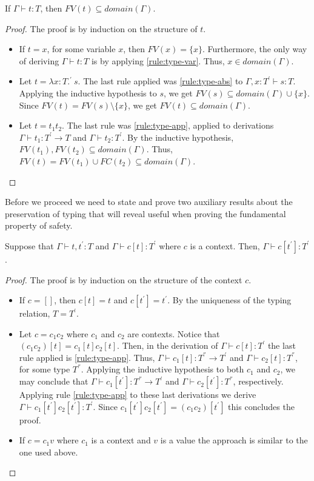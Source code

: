 \begin{lemma}\label{lemma3}
If $\Gamma \vdash t : T$, then $FV(t) \subseteq domain(\Gamma)$. 
\end{lemma} 
\begin{proof}
The proof is by induction on the structure of $t$. 
\begin{itemize}
\item If $t = x$, for some variable $x$, then  $FV(x) = \{x\}$. Furthermore, the only way of deriving $\Gamma \vdash t: T$ is by applying \eqref{rule:type-var}. Thus, $x \in domain(\Gamma)$. 
\item Let $t = \lambda x: T.^{'} \ s$. The last rule applied was \eqref{rule:type-abs} to $\Gamma, x : T^{'} \vdash  s: T$. Applying the inductive hypothesis to $s$, we get $FV(s) \subseteq domain(\Gamma) \cup \{x\}$. Since $FV(t) = FV(s) \setminus \{x\}$, we get $FV(t) \subseteq domain(\Gamma)$.   
\item Let $t = t_1t_2$. The last rule was \eqref{rule:type-app}, applied to derivations $\Gamma \vdash t_1: T^{'} \to T$ and $\Gamma \vdash t_2: T^{'}$. By the inductive hypothesis, $FV(t_1), FV(t_2) \subseteq domain(\Gamma)$. Thus, $FV(t) = FV(t_1) \cup FC(t_2) \subseteq domain(\Gamma)$. 
\end{itemize}
\end{proof} 

Before we proceed we need to state and prove two auxiliary results about the preservation of typing that will reveal useful when proving the fundamental property of safety. 

\begin{lemma}\label{lemma:typeContext}
Suppose that $\Gamma \vdash t, t^{'} : T$ and $\Gamma \vdash c[t] :T^{'}$ where $c$ is a context. Then, $\Gamma \vdash c[t^{'}] : T^{'}$.
\end{lemma}
\begin{proof}
The proof is by induction on the structure of the context $c$. 
\begin{itemize}
\item If $c = []$, then $c[t] = t$ and $c[t^{'}] = t^{'}$. By the uniqueness of the typing relation, $T = T^{'}$. 
\item Let $c = c_1c_2$ where $c_1$ and $c_2$ are contexts. Notice that $(c_1c_2)[t] = c_1[t]c_2[t]$. Then, in the derivation of $\Gamma \vdash c[t]: T^{'}$ the last rule applied is \eqref{rule:type-app}. Thus, $\Gamma \vdash c_1[t]: T^{''} \to T^{'}$ and $\Gamma \vdash c_2[t] : T^{''}$, for some type $T^{''}$. Applying the inductive hypothesis to both $c_1$ and $c_2$, we may conclude that $\Gamma \vdash c_1[t^{'}] :  T^{''} \to T^{'}$ and $\Gamma \vdash c_2[t^{'}] : T^{''}$, respectively. Applying rule \eqref{rule:type-app} to these last derivations we derive $\Gamma \vdash c_1[t^{'}]c_2[t^{'}] : T^{'}$. Since $c_1[t^{'}]c_2[t^{'}] = (c_1c_2)[t^{'}]$ this concludes the proof. 
\item If $c = c_1v$ where $c_1$ is a context and $v$ is a value the approach is similar to the one used above. 
\end{itemize}
\end{proof}


